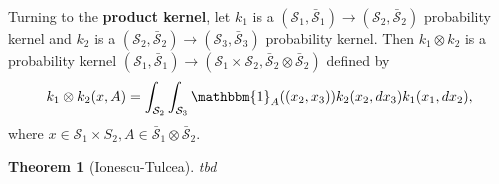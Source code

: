 \documentclass[10pt,a4paper]{article}
\newtheorem{definition}{Definition}
\newtheorem{theorem}{Theorem}
\begin{document}
Turning to the \textbf{product kernel},  let  $k_1$ is a $(\mathcal S_1, \bar{\mathcal S}_1) \rightarrow (\mathcal S_2, \bar{\mathcal S}_2)$ probability kernel  and $k_2$ is a $(\mathcal S_2, \bar{\mathcal S}_2) \rightarrow (\mathcal S_3, \bar{\mathcal S}_3)$ probability kernel. Then  $k_1 \otimes k_2$ is a probability kernel $(\mathcal S_1, \bar{\mathcal S}_1) \rightarrow (\mathcal S_1 \times \mathcal S_2, \bar{\mathcal S}_2 \otimes \bar{\mathcal S}_2)$ defined by
\begin{align}
	k_1\otimes k_2(x,  A) = \int _{\mathcal S_2}\int_{\mathcal S_3} \mathbbm{1}_A((x_2,x_3)) k_2 (x_2, dx_3)  k_1 (x_1, dx_2) ,  
\end{align}
where $x \in \mathcal S_1 \times S_2 , A \in \bar{\mathcal S}_1 \otimes  \bar{\mathcal S}_2$.

\begin{theorem}[Ionescu-Tulcea]
	tbd
\end{theorem}

\end{document}
